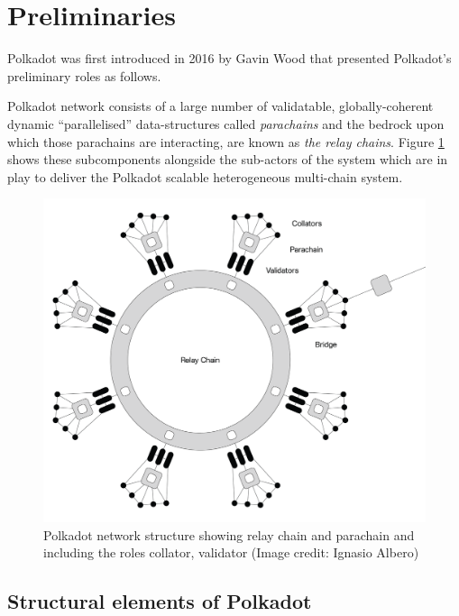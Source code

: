 \section{Preliminaries}\label{sec:preliminiary}

Polkadot was first introduced in 2016 by Gavin Wood \cite{2016:Wood:Polkadot} that presented Polkadot's preliminary roles as follows. 

Polkadot network consists of a large number of validatable, globally-coherent dynamic “parallelised” data-structures called  \emph{parachains} and the bedrock upon which those parachains are interacting, are known as \emph{the relay chains}. Figure \ref{fig:roles} shows these subcomponents alongside the sub-actors of the system which are in play to deliver the Polkadot scalable heterogeneous multi-chain system.

\begin{figure}[h]
	\centering
	\includegraphics[width=.7\textwidth]{images/Network@2x.png}
	\caption{Polkadot network structure showing relay chain and parachain and including the roles collator, validator (Image credit: Ignasio Albero)}
	\label{fig:roles}
\end{figure}
\subsection{Structural elements of Polkadot}

